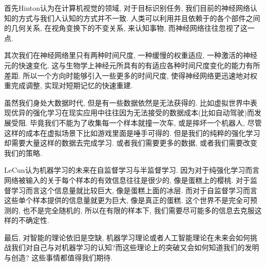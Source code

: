 \documentclass[lang=cn,11pt,a4paper]{elegantpaper}
\begin{document}
首先Hinton认为\cite{Youtube}在计算机视觉的领域, 对于目标识别任务, 我们目前的神经网络认知的方式与我们人认知的方式并不一致. 人类可以利用并且依赖于的各个部件之间的几何关系, 在视角变换下的不变关系, 来认知事物, 而神经网络往往忽视了这一点. \cite{kosiorek2019stacked}

其次我们在神经网络里只有两种时间尺度, 一种缓慢的权重适应, 一种激活的神经元的快速变化. 这与生物学上神经元所具有的有适应各种时间尺度变化的能力有所差距. 所以一个方向时能够引入一些更多的时间尺度, 使得神经网络更迅速地对权重完成调整, 实现对短期记忆的快速重建. 

虽然我们身处大数据时代, 但是有一些数据依然是无法获得的. 比如虚拟世界中表现优异的强化学习在现实应用中往往因为无法接受的数据成本(比如自动驾驶)而发展受阻. 毕竟我们不能为了收集每一个样本就撞一次车, 或是摔坏一个机器人, 尽管这样的成本在虚拟场景下比如游戏里面是唾手可得的. 但是我们的纯粹的强化学习却需要大量这样的数据去完成学习. 或者我们需要更多的数据, 或者我们需要改变我们的策略.

LeCun认为机器学习的未来在自监督学习与半监督学习. 因为对于纯强化学习而言网络被输入的关于每个样本的有效信息往往是很少的, 像是蛋糕上的樱桃. 对于监督学习而言这个信息量就比较巨大, 像是蛋糕上面的冰层. 而对于自监督学习而言这些单个样本提供的信息量就更为巨大, 像是真正的蛋糕. 这个世界不是完全可预测的, 也不是完全随机的, 所以在有限的样本下, 我们需要尽可能多的信息去克服这样的不确定性.

最后, 对智能的理论依旧是空缺, 机器学习理论或者人工智能理论在未来会如何挑战我们对自己与对机器学习的认知?而这些理论上的突破又会如何知道我们的发明与创造? 这些事情都值得我们期待.
\newpage
\appendix
{}
\end{document}
